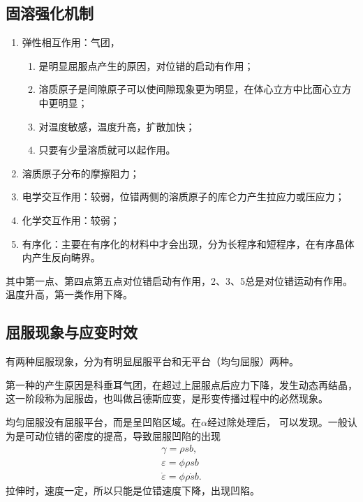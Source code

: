         \subsection{固溶强化机制}
            \begin{enumerate}
                \item 弹性相互作用：气团，
                \begin{enumerate}
                    \item 是明显屈服点产生的原因，对位错的启动有作用；
                    \item 溶质原子是间隙原子可以使间隙现象更为明显，在体心立方中比面心立方中更明显；
                    \item 对温度敏感，温度升高，扩散加快；
                    \item 只要有少量溶质就可以起作用。
                \end{enumerate}
                \item 溶质原子分布的摩擦阻力；
                \item 电学交互作用：较弱，位错两侧的溶质原子的库仑力产生拉应力或压应力；
                \item 化学交互作用：较弱；
                \item 有序化：主要在有序化的材料中才会出现，分为长程序和短程序，在有序晶体内产生反向畴界。
            \end{enumerate}
            其中第一点、第四点第五点对位错启动有作用，2、3、5总是对位错运动有作用。
            温度升高，第一类作用下降。
        \subsection{屈服现象与应变时效}
            有两种屈服现象，分为有明显屈服平台和无平台（均匀屈服）两种。
            
            第一种的产生原因是科垂耳气团，在超过上屈服点后应力下降，发生动态再结晶，
            这一阶段称为屈服齿，也叫做吕德斯应变，是形变传播过程中的必然现象。

            均匀屈服没有屈服平台，而是呈凹陷区域。在$\alpha$经过除处理后，
            可以发现。一般认为是可动位错的密度的提高，导致屈服凹陷的出现
            \begin{align}
                \gamma=\rho sb,\\
                \varepsilon=\phi\rho sb\\
                \dot{\varepsilon}=\phi\rho\dot{s}b.
            \end{align}
            拉伸时，速度一定，所以只能是位错速度下降，出现凹陷。
